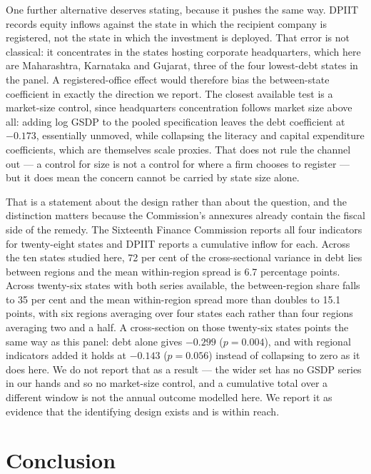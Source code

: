 \documentclass[12pt]{article}
\begin{document}
One further alternative deserves stating, because it pushes the same way. DPIIT
records equity inflows against the state in which the recipient company is
registered, not the state in which the investment is deployed. That error is not
classical: it concentrates in the states hosting corporate headquarters, which
here are Maharashtra, Karnataka and Gujarat, three of the four lowest-debt states
in the panel. A registered-office effect would therefore bias the between-state
coefficient in exactly the direction we report. The closest available test is a
market-size control, since headquarters concentration follows market size above
all: adding log GSDP to the pooled specification leaves the debt coefficient at
$-0.173$, essentially unmoved, while collapsing the literacy and capital
expenditure coefficients, which are themselves scale proxies. That does not rule
the channel out --- a control for size is not a control for where a firm chooses
to register --- but it does mean the concern cannot be carried by state size
alone.

That is a statement about the design rather than about the question, and the
distinction matters because the Commission's annexures already contain the fiscal
side of the remedy. The Sixteenth Finance Commission reports all four indicators
for twenty-eight states and DPIIT reports a cumulative inflow for each. Across
the ten states studied here, 72 per cent of the cross-sectional variance in debt
lies between regions and the mean within-region spread is 6.7 percentage points.
Across twenty-six states with both series available, the between-region share
falls to 35 per cent and the mean within-region spread more than doubles to 15.1
points, with six regions averaging over four states each rather than four regions
averaging two and a half. A cross-section on those twenty-six states points the
same way as this panel: debt alone gives $-0.299$ ($p = 0.004$), and with
regional indicators added it holds at $-0.143$ ($p = 0.056$) instead of collapsing
to zero as it does here. We do not report that as a result --- the wider set has
no GSDP series in our hands and so no market-size control, and a cumulative total
over a different window is not the annual outcome modelled here. We report it as
evidence that the identifying design exists and is within reach.

\section{Conclusion}
\end{document}
